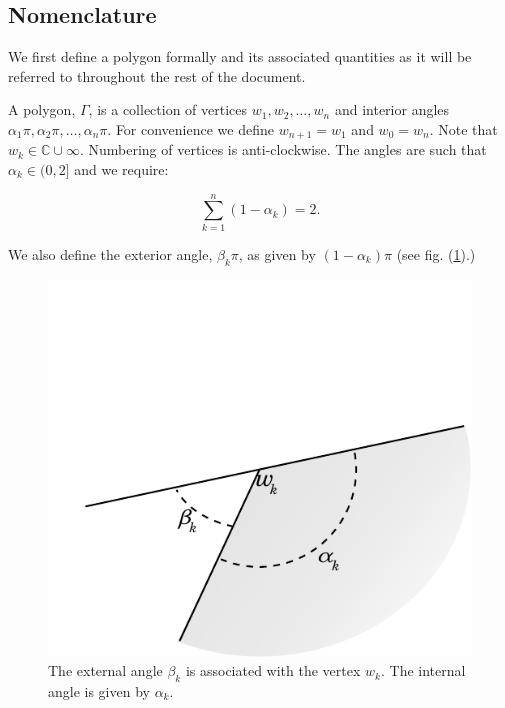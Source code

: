 \documentclass[a4paper,10pt]{amsart}
\begin{document}
\subsection{Nomenclature}

We first define a polygon formally and its associated quantities as it will be referred to throughout the rest of the document.

A polygon, $\Gamma$, is a collection of vertices $w_1, w_2,\dots,w_n$ and interior angles $\alpha_1\pi, \alpha_2\pi, \dots, \alpha_n\pi$. For convenience we define $w_{n+1} = w_1$ and $w_0=w_n$. Note that $w_k \in \mathbb{C} \cup {\infty}$. Numbering of vertices is anti-clockwise. The angles are such that $\alpha_k \in (0,2]$ and we require:

\begin{equation}
\sum_{k=1}^n (1-\alpha_k) = 2.
\end{equation}

We also define the exterior angle, $\beta_k\pi$, as given by $(1-\alpha_k)\pi$ (see fig. (\ref{anglediagram}).)

\begin{figure} [bp]
\centering
\includegraphics[scale=0.6]{figs/anglediagram.pdf}
\caption{The external angle $\beta_k$ is associated with the vertex $w_k$. The internal angle is given by $\alpha_k$.}
\label{anglediagram}
\end{figure}
\end{document}
